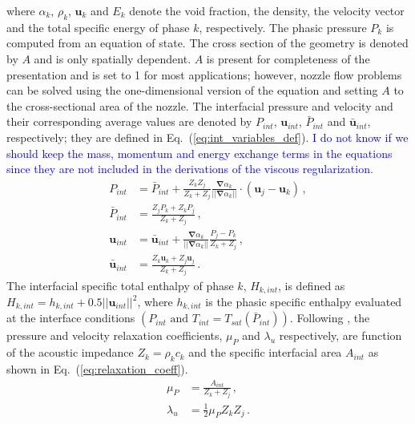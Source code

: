 \documentclass[preprint,10pt]{elsarticle}
\newcommand{\grad}{\mbold{\nabla}}
\newcommand{\mbold}[1]{\boldsymbol#1}
\newcommand{\eqt}[1]{Eq.~(\ref{#1})}                     %
\newcommand{\tcb}[1]{\textcolor{blue}{#1}}
\begin{document}
%
where $\alpha_k$, $\rho_k$, $\mbold u_k$ and $E_k$ denote the void fraction, the density, the velocity vector and the total specific energy of phase $k$, respectively. The phasic pressure $P_k$ is computed from an equation of state. The cross section of the geometry is denoted by $A$ and is only spatially dependent. $A$ is present for completeness of the presentation and is set to 1 for most applications; however, nozzle flow problems can be solved using the one-dimensional version of the equation and setting $A$ to the cross-sectional area of the nozzle. The interfacial pressure and velocity and their corresponding average values are denoted by $P_{int}$, $\mbold u_{int}$, $\bar{P}_{int}$ and $\bar{\mbold u}_{int}$, respectively; they are defined in \eqt{eq:int_variables_def}.
\tcb{I do not know if we should keep the mass, momentum and energy exchange terms in the equations since they are not included in the derivations of the viscous regularization.} 
%
\begin{subequations}
\label{eq:int_variables_def}
\begin{align}
  \label{E-R:83}
  P_{int} &= \bar{P}_{int} + \frac{Z_{k}Z_{j}}{Z_{k}+Z_{j}} \frac{\grad \alpha_{k}}{|| \grad \alpha_{k} ||} \cdot (\mbold u_{j}-\mbold u_{k}) \,,
  \\
  \bar{P}_{int} &= \frac{Z_{j}P_{k}+Z_{k}P_{j}}{Z_{k}+Z_{j}} \,,
 \\
  \label{E-R:84}
  \mbold u_{int} &= \bar{\mbold u}_{int} +  \frac{\grad \alpha_{k}}{|| \grad \alpha_{k} ||} \frac{P_{j}-P_{k}}{Z_{k}+Z_{j}} \,,
  \\
  \bar{\mbold u}_{int} &= \frac{Z_{k} \mbold u_{k}+Z_{j}\mbold u_{j}}{Z_{k}+Z_{j}} \,.
\end{align}
\end{subequations}
%
The interfacial specific total enthalpy of phase $k$, $H_{k,int}$, is defined as $H_{k,int} = h_{k,int} + 0.5 || \mbold u_{int} ||^2$, where $h_{k,int}$ is the phasic specific enthalpy evaluated at the interface conditions $(P_{int} \text{ and } T_{int} = T_{sat}(\bar{P}_{int}))$. Following \cite{SEM}, the pressure and velocity relaxation coefficients, $\mu_P$  and $\lambda_u$ respectively, are function of the acoustic impedance $Z_k = \rho_k c_k$ and the specific interfacial area $A_{int}$ as shown in \eqt{eq:relaxation_coeff}.
%
\begin{subequations}
\label{eq:relaxation_coeff}
\begin{align}
  \label{E-R:86}
  \mu_P &= \frac{A_{int}}{Z_{k}+Z_{j}}       \,,
  \\
  \label{E-R:85}
  \lambda_u &= \frac{1}{2} \mu_P Z_{k} Z_{j} \,.
\end{align}
\end{subequations}
\end{document}
